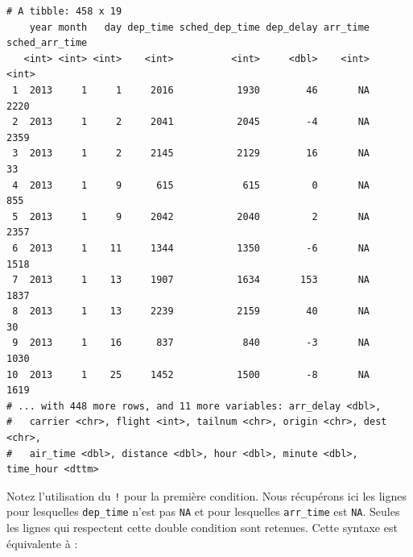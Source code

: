 \documentclass[a4paperpaper,]{article}
\newenvironment{Shaded}{\begin{snugshade}}{\end{snugshade}}
\newcommand{\KeywordTok}[1]{\textcolor[rgb]{0.13,0.29,0.53}{\textbf{#1}}}
\newcommand{\StringTok}[1]{\textcolor[rgb]{0.31,0.60,0.02}{#1}}
\newcommand{\OperatorTok}[1]{\textcolor[rgb]{0.81,0.36,0.00}{\textbf{#1}}}
\newcommand{\NormalTok}[1]{#1}
\theoremstyle{definition}
\theoremstyle{definition}
\theoremstyle{definition}
\theoremstyle{remark}
\begin{document}
\begin{verbatim}
# A tibble: 458 x 19
    year month   day dep_time sched_dep_time dep_delay arr_time sched_arr_time
   <int> <int> <int>    <int>          <int>     <dbl>    <int>          <int>
 1  2013     1     1     2016           1930        46       NA           2220
 2  2013     1     2     2041           2045        -4       NA           2359
 3  2013     1     2     2145           2129        16       NA             33
 4  2013     1     9      615            615         0       NA            855
 5  2013     1     9     2042           2040         2       NA           2357
 6  2013     1    11     1344           1350        -6       NA           1518
 7  2013     1    13     1907           1634       153       NA           1837
 8  2013     1    13     2239           2159        40       NA             30
 9  2013     1    16      837            840        -3       NA           1030
10  2013     1    25     1452           1500        -8       NA           1619
# ... with 448 more rows, and 11 more variables: arr_delay <dbl>,
#   carrier <chr>, flight <int>, tailnum <chr>, origin <chr>, dest <chr>,
#   air_time <dbl>, distance <dbl>, hour <dbl>, minute <dbl>, time_hour <dttm>
\end{verbatim}

Notez l'utilisation du \texttt{!} pour la première condition. Nous
récupérons ici les lignes pour lesquelles \texttt{dep\_time} n'est pas
\texttt{NA} et pour lesquelles \texttt{arr\_time} est \texttt{NA}.
Seules les lignes qui respectent cette double condition sont retenues.
Cette syntaxe est équivalente à :

\begin{Shaded}
\end{Shaded}
\end{document}
